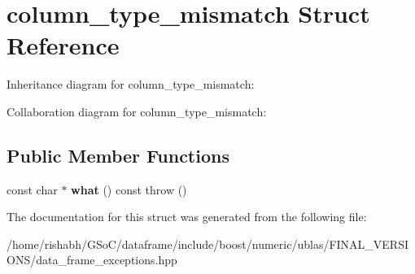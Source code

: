 \hypertarget{structcolumn__type__mismatch}{}\section{column\+\_\+type\+\_\+mismatch Struct Reference}
\label{structcolumn__type__mismatch}


Inheritance diagram for column\+\_\+type\+\_\+mismatch\+:


Collaboration diagram for column\+\_\+type\+\_\+mismatch\+:
\subsection*{Public Member Functions}
\begin{DoxyCompactItemize}
\item 
const char $\ast$ {\bfseries what} () const   throw ()\hypertarget{structcolumn__type__mismatch_a9580425b3504505804070c5a8266987f}{}\label{structcolumn__type__mismatch_a9580425b3504505804070c5a8266987f}

\end{DoxyCompactItemize}


The documentation for this struct was generated from the following file\+:\begin{DoxyCompactItemize}
\item 
/home/rishabh/\+G\+So\+C/dataframe/include/boost/numeric/ublas/\+F\+I\+N\+A\+L\+\_\+\+V\+E\+R\+S\+I\+O\+N\+S/data\+\_\+frame\+\_\+exceptions.\+hpp\end{DoxyCompactItemize}
